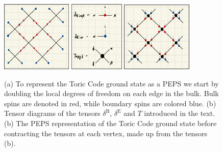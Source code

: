 \begin{figure}
	\centering
	\subcaptionbox{\label{fig:toric_code_doubling_dof}}
	{%
		\includegraphics[width=0.3\textwidth]{figures/Toric_Code/toric_code_doubling_dof.jpeg}
	}
	\subcaptionbox{\label{fig:toric_code_PEPS_representation_tensor_definitions}}
	{%
		\includegraphics[width=0.233\textwidth]{figures/Toric_Code/toric_code_PEPS_representation_tensor_definitions.jpeg}
	}
	\subcaptionbox{\label{fig:toric_code_PEPS_representation}}
	{%
		\includegraphics[width=0.3\textwidth]{figures/Toric_Code/toric_code_PEPS_representation.jpeg}
	}
	\caption{(a) To represent the Toric Code ground state as a PEPS we start by doubling the local degrees of freedom on each edge in the bulk. Bulk spins are denoted in red, while boundary spins are colored blue. (b) Tensor diagrams of the tensors $\delta^\text{B}$, $\delta^\text{E}$ and $T$ introduced in the text. (b) The PEPS representation of the Toric Code ground state before contracting the tensors at each vertex, made up from the tensors (b).}
	\label{fig:toric_code_doubling_dof_and_PEPS_representation}
\end{figure}
